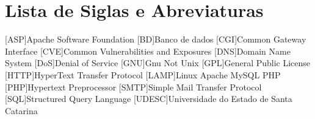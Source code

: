 \chapter*{Lista de Siglas e Abreviaturas}
\begin{acronym}

[ASP]{Apache Software Foundation}
[BD]{Banco de dados}
[CGI]{Common Gateway Interface}
[CVE]{Common Vulnerabilities and Exposures}
[DNS]{Domain Name System}
[DoS]{Denial of Service}
[GNU]{Gnu Not Unix}
[GPL]{General Public License}
[HTTP]{HyperText Transfer Protocol}
[LAMP]{Linux Apache MySQL PHP}
[PHP]{Hypertext Preprocessor}
[SMTP]{Simple Mail Transfer Protocol}
[SQL]{Structured Query Language}
[UDESC]{Universidade do Estado de Santa Catarina}
\begin{comment}
\acro{CLI}[CLI]{Command Line Interface}
\acro{CPU}[CPU]{Central Processing Unit}
\acro{DPCF}[DPCF]{Data Plane Control Function}
\acro{IETF}[IETF]{Internet Engineering Task Force}
\acro{IO}[I/O]{Input/Output}
\acro{LSD}[LSD]{Link State Database}
\acro{NFS}[NFS]{Network File System}
\acro{ONF}[ONF]{Open Networking Fundation}
\acro{OSPF}[OSPF]{Open Shortest Path First}
\acro{PRNG}[PRNG]{Pseudo-Random Number Generator}
\acro{QOS}[QOS]{Quality of Service}
\acro{RAM}[RAM]{Random Access Memory}
\acro{SDN}[SDN]{Software Defined Network}
\acro{SNMP}[SNMP]{Simple Network Management Protocol}
\end{comment}

\end{acronym}

